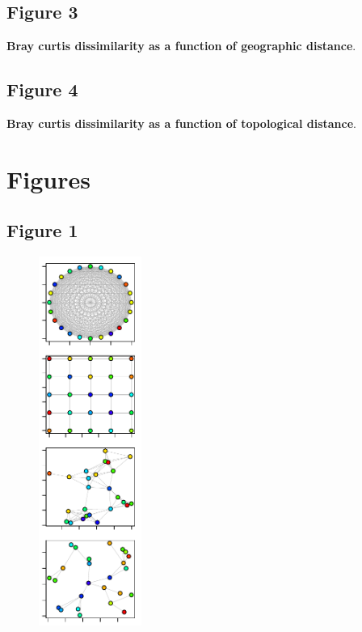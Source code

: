 \documentclass[12pt]{article}
\begin{document}
\subsection*{Figure 3}
\textbf{Bray curtis dissimilarity as a function of geographic distance}. 

\subsection*{Figure 4}
\textbf{Bray curtis dissimilarity as a function of topological distance}. 

\newpage

\section*{Figures}

\subsection*{Figure 1}

\begin{figure}[ht!]
	\centering\includegraphics[width=0.3\textwidth]{Networks.pdf}
\end{figure}
\end{document}

